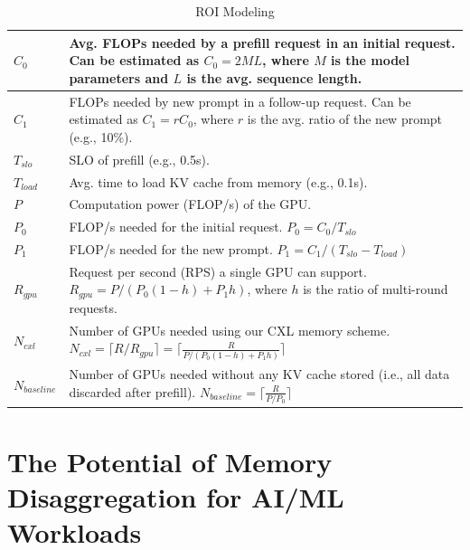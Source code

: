 \begin{table}[ht]
    \caption{ROI Modeling}
    \label{tab:roi}
    \centering
    \small %
    \begin{tabularx}{\columnwidth}{lX}
        \hline
        $C_{0}$         & Avg. FLOPs needed by a prefill request in an initial request. Can be estimated as $C_{0}=2ML$, where $M$ is the model parameters and $L$ is the avg. sequence length. \\ \hline
        $C_{1}$         & FLOPs needed by new prompt in a follow-up request. Can be estimated as $C_{1}=rC_0$, where $r$ is the avg. ratio of the new prompt (e.g., 10\%). \\ \hline
        $T_{slo}$       & SLO of prefill (e.g., 0.5s). \\ \hline
        $T_{load}$      & Avg. time to load KV cache from memory (e.g., 0.1s). \\ \hline
        $P$             & Computation power (FLOP/s) of the GPU. \\ \hline
        $P_0$           & FLOP/s needed for the initial request. $P_{0} = C_{0}/T_{slo}$ \\ \hline
        $P_1$           & FLOP/s needed for the new prompt. $P_{1}=C_{1}/(T_{slo}-T_{load})$  \\ \hline
        $R_{gpu}$       & Request per second (RPS) a single GPU can support. $R_{gpu} = P/(P_{0}(1-h)+P_{1}h)$, where $h$ is the ratio of multi-round requests. \\ \hline
        $N_{cxl}$       & Number of GPUs needed using our CXL memory scheme. $N_{cxl} = \lceil R/R_{gpu} \rceil = \lceil \frac{R}{P/(P_{0}(1-h)+P_{1}h)} \rceil$ \\ \hline
        $N_{baseline}$  & Number of GPUs needed without any KV cache stored (i.e., all data discarded after prefill). $N_{baseline} = \lceil \frac{R}{P/P_0} \rceil$\\ \hline
    \end{tabularx}
\end{table}


\section{The Potential of Memory Disaggregation for AI/ML Workloads}

